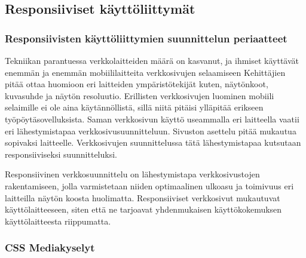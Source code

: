 \documentclass[11pt,a4paper,titlepage,oneside]{article}
\begin{document}
\newpage
\subsection{Responsiiviset käyttöliittymät}        %




\subsubsection{Responsiivisten käyttöliittymien suunnittelun periaatteet}




Tekniikan parantuessa verkkolaitteiden määrä on kasvanut, ja ihmiset käyttävät enemmän ja enemmän mobiililaitteita verkkosivujen selaamiseen
Kehittäjien pitää ottaa huomioon eri laitteiden ympäristötekijät kuten, näytönkoot, kuvasuhde ja näytön resoluutio.
Erillisten verkkosivujen luominen mobiili selaimille ei ole aina käytännöllistä, sillä niitä pitäisi ylläpitää erikseen työpöytäsovelluksista.
Saman verkkosivun käyttö useammalla eri laitteella vaatii eri lähestymistapaa verkkosivusuunnitteluun. 
Sivuston asettelu pitää mukautua sopivaksi laitteelle.
Verkkosivujen suunnittelussa tätä lähestymistapaa kutsutaan responsiiviseksi suunnitteluksi.
\medskip



Responsiivinen verkkosuunnittelu on lähestymistapa verkkosivustojen rakentamiseen,
jolla varmistetaan niiden optimaalinen ulkoasu ja toimivuus eri laitteilla näytön koosta huolimatta. 
Responsiiviset verkkosivut mukautuvat käyttölaitteeseen, siten että ne tarjoavat yhdenmukaisen käyttökokemuksen käyttölaitteesta riippumatta.
\medskip





\subsubsection{CSS Mediakyselyt}


\end{document}
